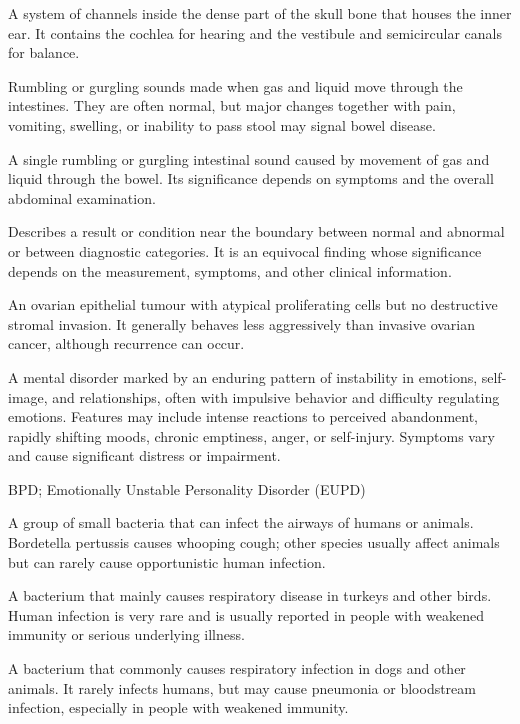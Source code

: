  A system of channels inside the dense part of the skull bone that houses the inner ear. It contains the cochlea for hearing and the vestibule and semicircular canals for balance.

 Rumbling or gurgling sounds made when gas and liquid move through the intestines. They are often normal, but major changes together with pain, vomiting, swelling, or inability to pass stool may signal bowel disease.

 A single rumbling or gurgling intestinal sound caused by movement of gas and liquid through the bowel. Its significance depends on symptoms and the overall abdominal examination.

 Describes a result or condition near the boundary between
normal and abnormal or between diagnostic categories. It is an equivocal
finding whose significance depends on the measurement, symptoms, and other
clinical information.

 An ovarian epithelial tumour with atypical
proliferating cells but no destructive stromal invasion. It generally behaves
less aggressively than invasive ovarian cancer, although recurrence can occur.

 A mental disorder marked by an enduring pattern of instability in emotions, self-image, and relationships, often with impulsive behavior and difficulty regulating emotions.
Features may include intense reactions to perceived abandonment, rapidly shifting
moods, chronic emptiness, anger, or self-injury. Symptoms vary and cause
significant distress or impairment.

\synonyms
BPD; Emotionally Unstable Personality Disorder (EUPD)

 A group of small bacteria that can infect the airways of humans or animals. Bordetella pertussis causes whooping cough; other species usually affect animals but can rarely cause opportunistic human infection.

 A bacterium that mainly causes respiratory disease in turkeys and other birds. Human infection is very rare and is usually reported in people with weakened immunity or serious underlying illness.

 A bacterium that commonly causes respiratory infection in dogs and other animals. It rarely infects humans, but may cause pneumonia or bloodstream infection, especially in people with weakened immunity.

